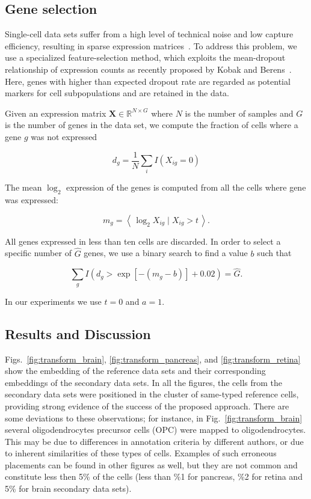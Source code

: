 \documentclass[runningheads]{llncs}
\begin{document}
\subsection{Gene selection\label{sec:gene-selection}}

Single-cell data sets suffer from a high level of technical noise and low capture efficiency, resulting in sparse expression matrices~\cite{umi}. To address this problem, we use a specialized feature-selection method, which exploits the mean-dropout relationship of expression counts as recently proposed by Kobak and Berens~\cite{art_of_using_tsne}. Here, genes with higher than expected dropout rate are regarded as potential markers for cell subpopulations and are retained in the data.

Given an expression matrix $\mathbf{X} \in \mathbb{R}^{N \times G}$ where $N$ is the number of samples and $G$ is the number of genes in the data set, we compute the fraction of cells where a gene $g$ was not expressed

\begin{equation}
d_g = \frac{1}{N} \sum_i I \left ( X_{ig} = 0\right )
\end{equation}

\noindent The mean $\log_2$ expression of the genes is computed from all the cells where gene was expressed:

\begin{equation}
m_g = \left \langle \, \log_2 X_{ig} \mid X_{ig} > t \, \right \rangle.
\end{equation}

All genes expressed in less than ten cells are discarded. In order to select a specific number of $\hat{G}$ genes, we use a binary search to find a value $b$ such that

\begin{equation}
\sum_g I \left (d_g > \exp \left [ -(m_g - b) \right ] + 0.02 \right ) = \hat{G}.
\end{equation}

\noindent In our experiments we use $t=0$ and $a=1$.


\subsection{Results and Discussion}

Figs.~\ref{fig:transform_brain}, \ref{fig:transform_pancreas}, and \ref{fig:transform_retina} show the embedding of the reference data sets and their corresponding embeddings of the secondary data sets. In all the figures, the cells from the secondary data sets were positioned in the cluster of same-typed reference cells, providing strong evidence of the success of the proposed approach. There are some deviations to these observations; for instance, in Fig.~\ref{fig:transform_brain} several oligodendrocytes precursor cells (OPC) were mapped to oligodendrocytes. This may be due to differences in annotation criteria by different authors, or due to inherent similarities of these types of cells. Examples of such erroneous placements can be found in other figures as well, but they are not common and constitute less then 5\% of the cells (less than \%1 for pancreas, \%2 for retina and 5\% for brain secondary data sets).
\end{document}
